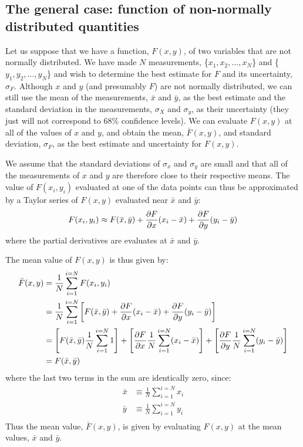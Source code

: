 \subsection{The general case: function of non-normally distributed quantities}
\label{sec:generalFgauss}
Let us suppose that we have a function, $F(x,y)$, of two variables that are not normally distributed. We have made $N$ measurements, \{$x_1, x_2, \dots, x_N$\} and \{$y_1, y_2, \dots, y_N$\} and wish to determine the best estimate for $F$ and its uncertainty, $\sigma_F$. Although $x$ and $y$ (and presumably $F$) are not normally distributed, we can still use the mean of the measurements, $\bar x$ and $\bar y$, as the best estimate and the standard deviation in the measurements, $\sigma_X$ and $\sigma_y$, as their uncertainty (they just will not correspond to 68\% confidence levels). We can evaluate $F(x,y)$ at all of the values of $x$ and $y$, and obtain the mean, $\bar F(x,y)$, and standard deviation, $\sigma_F$, as the best estimate and uncertainty for $F(x,y)$. 

We assume that the standard deviations of $\sigma_x$ and $\sigma_y$ are small and that all of the measurements of $x$ and $y$ are therefore close to their respective means. The value of $F(x_i,y_i)$ evaluated at one of the data points can thus be approximated by a Taylor series of $F(x,y)$ evaluated near $\bar x$ and $\bar y$:
\begin{align}
F(x_i,y_i)\approx F(\bar x,\bar y)+\frac{\partial F}{\partial x}(x_i-\bar x)+\frac{\partial F}{\partial y}(y_i-\bar y)
\end{align} 
where the partial derivatives are evaluates at $\bar x$ and $\bar y$.

The mean value of $F(x,y)$ is thus given by:
\begin{align}
\bar F(x,y)&=\frac{1}{N}\sum_{i=1}^{i=N}F(x_i,y_i)\nonumber\\
&=\frac{1}{N}\sum_{i=1}^{i=N} \left[ F(\bar x,\bar y)+\frac{\partial F}{\partial x}(x_i-\bar x)+\frac{\partial F}{\partial y}(y_i-\bar y)  \right]\nonumber\\
&=\left[F(\bar x,\bar y)\frac{1}{N}\sum_{i=1}^{i=N}1 \right]+\left[\frac{\partial F}{\partial x}\frac{1}{N}\sum_{i=1}^{i=N}(x_i-\bar x) \right]+\left[\frac{\partial F}{\partial y}\frac{1}{N}\sum_{i=1}^{i=N}(y_i-\bar y) \right]\nonumber\\
&=F(\bar x,\bar y)
\end{align}
where the last two terms in the sum are identically zero, since:
\begin{align}
\bar x &\equiv \frac{1}{N}\sum_{i=1}^{i=N}x_i\nonumber\\
\bar y &\equiv \frac{1}{N}\sum_{i=1}^{i=N}y_i\nonumber\\
\end{align} 
Thus the mean value, $\bar F(x,y)$, is given by evaluating $F(x,y)$ at the mean values, $\bar x$ and $\bar y$.

